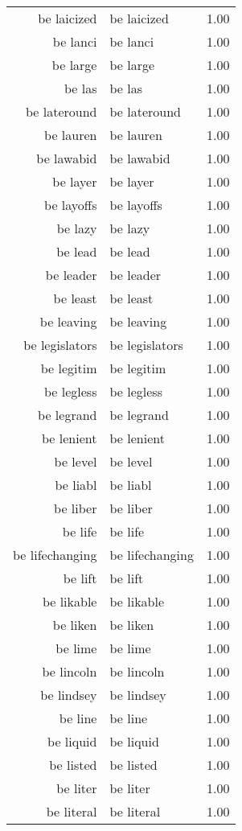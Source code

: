 \begin{table}[ht]
\begin{tabular}{rlr}
  be laicized & be laicized & 1.00 \\ 
  be lanci & be lanci & 1.00 \\ 
  be large & be large & 1.00 \\ 
  be las & be las & 1.00 \\ 
  be lateround & be lateround & 1.00 \\ 
  be lauren & be lauren & 1.00 \\ 
  be lawabid & be lawabid & 1.00 \\ 
  be layer & be layer & 1.00 \\ 
  be layoffs & be layoffs & 1.00 \\ 
  be lazy & be lazy & 1.00 \\ 
  be lead & be lead & 1.00 \\ 
  be leader & be leader & 1.00 \\ 
  be least & be least & 1.00 \\ 
  be leaving & be leaving & 1.00 \\ 
  be legislators & be legislators & 1.00 \\ 
  be legitim & be legitim & 1.00 \\ 
  be legless & be legless & 1.00 \\ 
  be legrand & be legrand & 1.00 \\ 
  be lenient & be lenient & 1.00 \\ 
  be level & be level & 1.00 \\ 
  be liabl & be liabl & 1.00 \\ 
  be liber & be liber & 1.00 \\ 
  be life & be life & 1.00 \\ 
  be lifechanging & be lifechanging & 1.00 \\ 
  be lift & be lift & 1.00 \\ 
  be likable & be likable & 1.00 \\ 
  be liken & be liken & 1.00 \\ 
  be lime & be lime & 1.00 \\ 
  be lincoln & be lincoln & 1.00 \\ 
  be lindsey & be lindsey & 1.00 \\ 
  be line & be line & 1.00 \\ 
  be liquid & be liquid & 1.00 \\ 
  be listed & be listed & 1.00 \\ 
  be liter & be liter & 1.00 \\ 
  be literal & be literal & 1.00 \\ 

\end{tabular}
\end{table}
